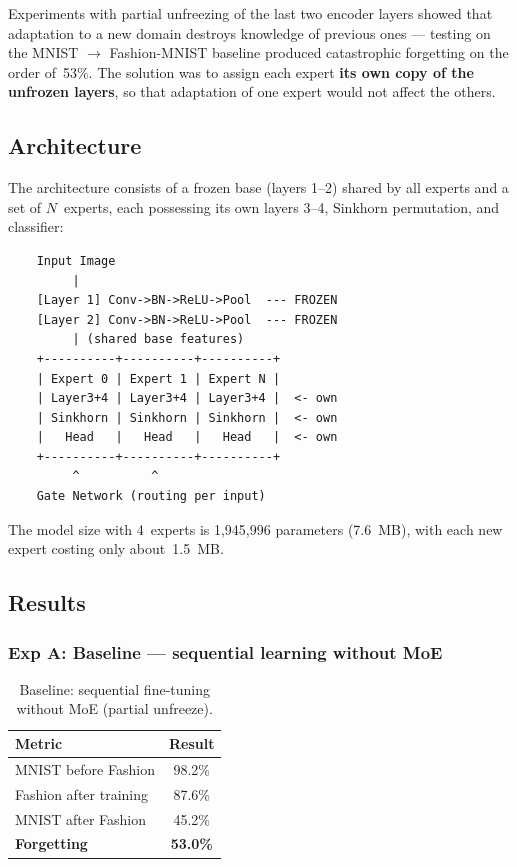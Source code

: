 \documentclass[11pt,a4paper]{report}
\begin{document}
Experiments with partial unfreezing of the last two encoder layers showed that adaptation to a new domain destroys knowledge of previous ones --- testing on the MNIST $\to$ Fashion-MNIST baseline produced catastrophic forgetting on the order of~53\%. The solution was to assign each expert \textbf{its own copy of the unfrozen layers}, so that adaptation of one expert would not affect the others.

\subsection{Architecture}

The architecture consists of a frozen base (layers 1--2) shared by all experts and a set of $N$~experts, each possessing its own layers 3--4, Sinkhorn permutation, and classifier:

\begin{verbatim}
    Input Image
         |
    [Layer 1] Conv->BN->ReLU->Pool  --- FROZEN
    [Layer 2] Conv->BN->ReLU->Pool  --- FROZEN
         | (shared base features)
    +----------+----------+----------+
    | Expert 0 | Expert 1 | Expert N |
    | Layer3+4 | Layer3+4 | Layer3+4 |  <- own
    | Sinkhorn | Sinkhorn | Sinkhorn |  <- own
    |   Head   |   Head   |   Head   |  <- own
    +----------+----------+----------+
         ^          ^
    Gate Network (routing per input)
\end{verbatim}

The model size with 4~experts is 1,945,996 parameters (7.6~MB), with each new expert costing only about~1.5~MB.

\subsection{Results}

\subsubsection*{Exp A: Baseline --- sequential learning without MoE}

\begin{table}[h]
\centering
\caption{Baseline: sequential fine-tuning without MoE (partial unfreeze).}
\begin{tabular}{l c}
\hline
\textbf{Metric} & \textbf{Result} \\
\hline
MNIST before Fashion & 98.2\% \\
Fashion after training & 87.6\% \\
MNIST after Fashion & 45.2\% \\
\textbf{Forgetting} & \textbf{53.0\%} \\
\hline
\end{tabular}
\end{table}
\end{document}
